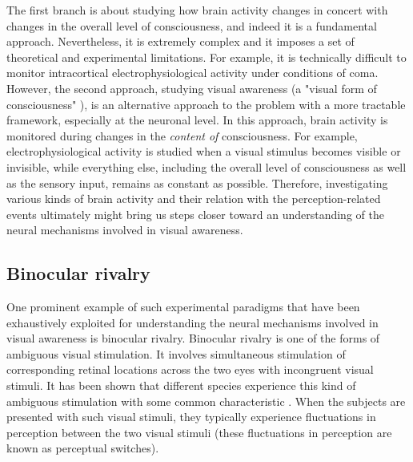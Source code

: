 The first branch is about studying how brain activity changes in concert with changes in the overall level of consciousness, and indeed it is a fundamental approach. 
Nevertheless, it is extremely complex and it imposes a set of theoretical and experimental limitations. 
For example, it is technically difficult to monitor intracortical electrophysiological activity under conditions of coma. 
However, the second approach, \ie studying visual awareness 
(a "visual form of consciousness" \cite{crickVisualPerceptionRivalry1996a}), 
is an alternative approach to the problem with a more tractable framework,
especially at the neuronal level. 
In this approach, brain activity is monitored during changes in the \emph{content of} consciousness. 
For example, electrophysiological activity is studied when a visual stimulus becomes visible or invisible,
while everything else, including the overall level of consciousness as well as the sensory input, 
remains as constant as possible. 
Therefore, investigating various kinds of brain activity and their relation with the perception-related events ultimately might bring us steps closer toward an understanding of the neural mechanisms involved in visual awareness.

\subsection{Binocular rivalry}
One prominent example of such experimental paradigms that have been exhaustively exploited for
understanding the neural mechanisms involved in visual awareness is binocular
rivalry.
Binocular rivalry is one of the forms of ambiguous visual stimulation. 
It involves simultaneous stimulation of corresponding retinal locations
across the two eyes with incongruent visual stimuli.
It has been shown that different species experience this kind of ambiguous stimulation with some common characteristic \cite{carterPerceptualRivalryAnimal2020}.
When the subjects are presented with such visual stimuli, 
they typically experience fluctuations in perception between the two visual stimuli
(these fluctuations in perception are known as perceptual switches).

